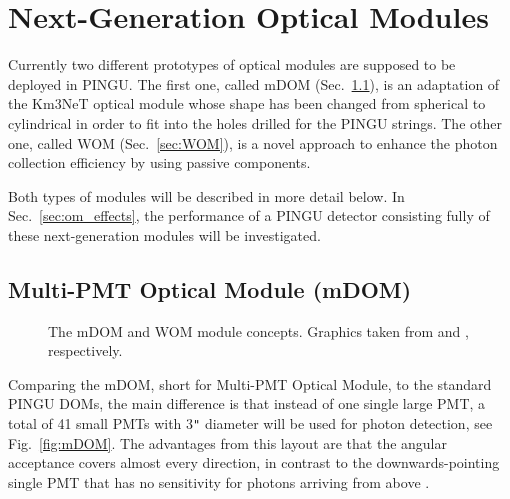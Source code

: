 \section{Next-Generation Optical Modules}
\label{sec:Gen2DOM}

Currently two different prototypes of optical modules are supposed to be
deployed in PINGU. The first one, called mDOM (Sec.~\ref{sec:mDOM}), is an
adaptation of the Km3NeT optical module \cite{Km3NeTmodule} whose shape has been
changed from spherical to cylindrical in order to fit into the holes drilled for
the PINGU strings. The other one, called WOM (Sec.~\ref{sec:WOM}), is a novel
approach to enhance the photon collection efficiency by using passive
components.

Both types of modules will be described in more detail below. In
Sec.~\ref{sec:om_effects}, the performance of a PINGU detector consisting fully
of these next-generation modules will be investigated.

\subsection{Multi-PMT Optical Module (mDOM)}
\label{sec:mDOM}


\begin{figure}
\centering
  \qquad
  \caption{The \protect{} mDOM and \protect{} WOM
    module concepts. Graphics taken from \cite{mDOM_Geneva} and \cite{WOM_ICRC},
    respectively.}
\label{fig:Gen3modules}
\end{figure}

Comparing the mDOM, short for Multi-PMT Optical Module, to the standard PINGU
DOMs, the main difference is that instead of one single large PMT, a total of
41 small PMTs with 3\verb+"+ diameter will be used for photon detection, see
Fig.~\ref{fig:mDOM}. The advantages from this layout are that the angular
acceptance covers almost every direction, in contrast to the downwards-pointing
single PMT that has no sensitivity for photons arriving from above
\cite{mDOM_Geneva}.

